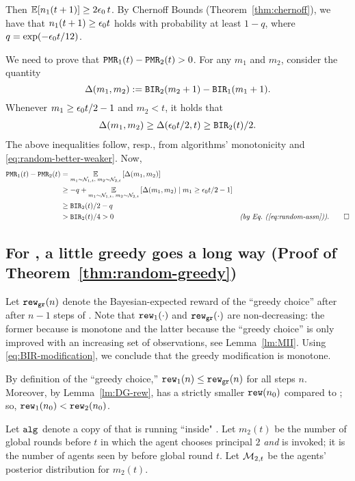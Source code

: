 Then
    $\E[n_1(t+1)] \geq 2\eps_0\,t $.
By Chernoff Bounds (Theorem~\ref{thm:chernoff}), we have that
    $n_1(t+1)\geq \epsilon_0 t$
holds with probability at least $1-q$,
where $q = \exp(-\epsilon_0 t/12)$.

We need to prove that
    $\mathtt{PMR}_1(t) - \mathtt{PMR}_2(t)>0$.
For any $m_1$ and $m_2$, consider the quantity
\[ \Delta(m_1,m_2) := \mathtt{BIR}_2(m_2+1) - \mathtt{BIR}_1(m_1+1).\]
Whenever $m_1 \geq \epsilon_0 t/2 -1$ and $m_2<t$, it holds that
\begin{align*}
\Delta(m_1,m_2) \geq \Delta(\epsilon_0 t / 2, t)
    \geq \mathtt{BIR}_2(t)/2.
\end{align*}
The above inequalities follow, resp., from algorithms' monotonicity and \eqref{eq:random-better-weaker}. Now,
\begin{align*}
\PMR_1(t) - \PMR_2(t)
    &= \Ex{m_1\sim \posteriorN{1}{t},\;m_2\sim \posteriorN{2}{t}}{\Delta(m_1,m_2)} \\
    &\geq -q
        + \Ex{m_1\sim \posteriorN{1}{t},\;m_2\sim \posteriorN{2}{t}}
            {\Delta(m_1,m_2)\mid m_1 \geq \eps_0 t/2-1} \\
    &\geq \BIR_2(t)/2-q \\
    &> \BIR_2(t)/4 > 0
    &\EqComment{by \refeq{eq:random-assn}}. \qedhere
\end{align*}

\subsection{For \HardMaxRandom, a little greedy goes a long way
(Proof of Theorem~\ref{thm:random-greedy})}
\label{sec:proofs-HMR-main}


  Let $\mathtt{rew}_{\texttt{gr}}(n)$ denote the Bayesian-expected reward of the ``greedy
  choice'' after after $n-1$ steps of \alg[1]. Note that
  $\mathtt{rew}_1(\cdot)$ and $\mathtt{rew}_{\texttt{gr}}(\cdot)$ are non-decreasing: the former
  because \alg[1] is monotone and the latter because the ``greedy
  choice'' is only improved with an increasing set of
  observations, see Lemma~\ref{lm:MII}. 
Using \eqref{eq:BIR-modification}, we conclude that
the greedy modification \alg[2] is monotone.

  By definition of the ``greedy choice,'' $\mathtt{rew}_1(n)\leq \mathtt{rew}_{\texttt{gr}}(n)$
  for all steps $n$. Moreover, by Lemma~\ref{lm:DG-rew},
  \alg[1] has a strictly smaller $\mathtt{rew}(n_0)$ compared to \DynGreedy;
  so, $\mathtt{rew}_1(n_0)<\mathtt{rew}_2(n_0)$.

Let $\mathtt{alg}_{}$ denote a copy of \alg[1] that is running ``inside" \alg[2]. Let $m_2(t)$ be the number of global rounds before $t$ in which the agent chooses principal $2$ \emph{and} \alg is invoked; \ie it is the number of agents seen by \alg before global round $t$. Let $\mathcal{M}_{2,t}$ be the agents' posterior distribution for $m_2(t)$.

